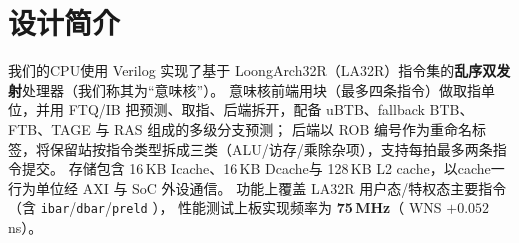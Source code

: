 \section{设计简介}

我们的CPU使用 Verilog 实现了基于 LoongArch32R（LA32R）指令集的\textbf{乱序双发射}处理器（我们称其为“意味核”）。
意味核前端用块（最多四条指令）做取指单位，并用 FTQ/IB 把预测、取指、后端拆开，配备 uBTB、fallback BTB、FTB、TAGE 与 RAS 组成的多级分支预测；
后端以 ROB 编号作为重命名标签，将保留站按指令类型拆成三类（ALU/访存/乘除杂项），支持每拍最多两条指令提交。
存储包含 16\,KB Icache、16\,KB Dcache与 128\,KB L2 cache，以cache一行为单位经 AXI 与 SoC 外设通信。
功能上覆盖 LA32R 用户态/特权态主要指令（含 \texttt{ibar}/\texttt{dbar}/\texttt{preld} ），
性能测试上板实现频率为 \textbf{75\,MHz}（ WNS $+0.052$\,ns）。
